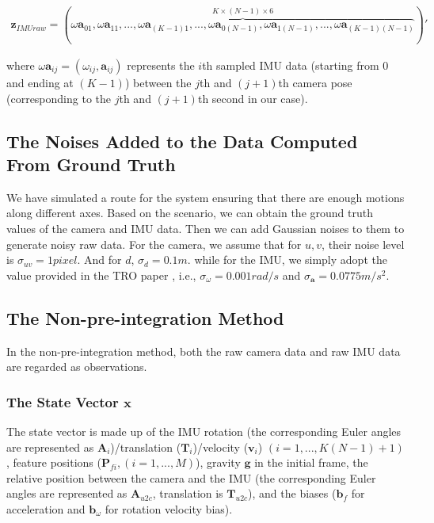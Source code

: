 \documentclass[12pt]{article}   %
\newcounter{case}
\begin{document}
\begin{align}
\textbf{z}_{IMUraw} = (\overbrace{\omega\textbf{a}_{01}, \omega\textbf{a}_{11}, ... , \omega\textbf{a}_{(K-1)1}, ..., \omega\textbf{a}_{0(N-1)}, \omega\textbf{a}_{1(N-1)}, ... , \omega\textbf{a}_{(K-1)(N-1)}}^{K \times (N-1) \times 6})' 
\end{align}

where $\omega\textbf{a}_{ij} = (\omega_{ij}, \textbf{a}_{ij})$ represents the $i$th sampled IMU data (starting from 0 and ending at $(K-1)$) between the $j$th and $(j+1)$th camera pose (corresponding to the $j$th and $(j+1)$th second in our case).

\subsection{The Noises Added to the Data Computed From Ground Truth}

We have simulated a route for the system ensuring that there are enough motions along different axes. Based on the scenario, we can obtain the ground truth values of the camera and IMU data. Then we can add Gaussian noises to them to generate noisy raw data. For the camera, we assume that for $u, v$, their noise level is $\sigma _{uv} = 1  pixel$. And for $d$, $\sigma _{d} = 0.1  m$. while for the IMU, we simply adopt the value provided in the TRO paper \cite{Lupton2012}, i.e., $\sigma _{\omega} = 0.001  rad/s$ and $ \sigma _{\textbf{a}} = 0.0775  m/s^2$.

\subsection{The Non-pre-integration Method}

In the non-pre-integration method, both the raw camera data and raw IMU data are regarded as observations.

\subsubsection{The State Vector $\textbf{x}$}

The state vector is made up of the IMU rotation (the corresponding Euler angles are represented as $\textbf{A}_{i}$)/translation ($\textbf{T}_{i}$)/velocity ($\textbf{v}_{i}$) $(i = 1, ..., K(N-1)+1)$, feature positions ($\textbf{P}_{fi}, (i = 1, ..., M)$), gravity $\textbf{g}$ in the initial frame, the relative position between the camera and the IMU (the corresponding Euler angles are represented as $\textbf{A}_{u2c}$, translation is $\textbf{T}_{u2c}$), and the biases ($\textbf{b}_{f}$ for acceleration and $\textbf{b}_{\omega}$ for rotation velocity bias).
\end{document}
